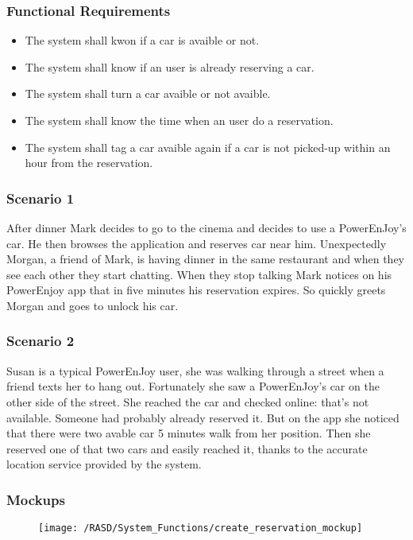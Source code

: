 \subsubsection{Functional Requirements}
\begin{itemize}
  \item The system shall kwon if a car is avaible or not.
  \item The system shall know if an user is already reserving a car.
  \item The system shall turn a car avaible or not avaible.
  \item The system shall know the time when an user do a reservation.
  \item The system shall tag a car avaible again if a car is not picked-up within an hour from the reservation.
\end{itemize}

\subsubsection{Scenario 1}
After dinner Mark decides to go to the cinema and decides to use a PowerEnJoy's car. He then browses the application and reserves car near him.
Unexpectedly Morgan, a friend of Mark, is having dinner in the same restaurant and when they see each other they start chatting. When they stop talking Mark notices on his PowerEnjoy app that in five minutes his reservation expires. So quickly greets Morgan and goes to unlock his car.

\subsubsection{Scenario 2}
Susan is a typical PowerEnJoy user, she was walking through a street when a friend texts her to hang out. Fortunately she saw a PowerEnJoy's car on the other side of the street. She reached the car and checked online: that's not available. Someone had probably already reserved it. But on the app she noticed that there were two avable car 5 minutes walk from her position. Then she reserved one of that two cars and easily reached it, thanks to the accurate location service provided by the system. 


\newpage
\subsubsection{Mockups}
\begin{figure}[!ht]
  \centering
  \vspace{0.1cm}
  \texttt{[image: /RASD/System\_Functions/create\_reservation\_mockup]}\\
  \vspace{0.4cm}
  \label{fig:create_reservation_mockup} 
\end{figure}


